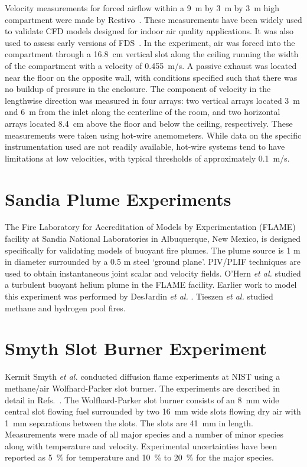 Velocity measurements for forced airflow within a 9~m by 3~m by 3~m high compartment were made by Restivo~\cite{Restivo:1979}. These measurements
have been widely used to validate CFD models designed for indoor air quality applications. It was also used to assess early versions of
FDS~\cite{Emmerich:1,Emmerich:2,Musser:1}. In the experiment, air was forced into the compartment through a 16.8~cm vertical slot along the ceiling
running the width of the compartment with a velocity of 0.455~m/s. A passive exhaust was located near the floor on the opposite wall, with
conditions specified such that there was no buildup of pressure in the enclosure. The component
of velocity in the lengthwise direction was measured in four arrays: two vertical arrays located 3~m and 6~m  from the inlet along the
centerline of the room, and two horizontal arrays located 8.4~cm above the floor and below the ceiling, respectively.
These measurements were taken using hot-wire anemometers. While data on the specific
instrumentation used are not readily available, hot-wire systems tend to have limitations at low velocities,
with typical thresholds of approximately 0.1~m/s.


\section{Sandia Plume Experiments}

The Fire Laboratory for Accreditation of Models by Experimentation (FLAME) facility \cite{OHern:2005,Blanchat:2001} at Sandia National Laboratories in Albuquerque, New Mexico,
is designed specifically for validating models of buoyant fire plumes.  The plume source is 1 m in diameter surrounded by a 0.5 m steel `ground plane'.
PIV/PLIF techniques are used to obtain instantaneous joint scalar and velocity fields.  O'Hern {\em et al.} \cite{OHern:2005} studied a turbulent buoyant helium plume in the FLAME facility.
Earlier work to model this experiment was performed by DesJardin {\em et al.} \cite{DesJardin:2004}. Tieszen {\em et al.} \cite{Tieszen:2004,Tieszen:2002} studied methane and
hydrogen pool fires.


\section{Smyth Slot Burner Experiment}

Kermit Smyth {\em et al.} conducted diffusion flame experiments at NIST using a methane/air Wolfhard-Parker slot burner.  The experiments are described in
detail in Refs.~\cite{Norton:1,Smyth:1}.  The Wolfhard-Parker slot burner consists of an 8~mm wide
central slot flowing fuel surrounded by two 16~mm wide slots flowing dry air with 1~mm separations between the slots.
The slots are 41~mm in length.  Measurements were made of all major species and a number of minor species along with temperature
and velocity.  Experimental uncertainties have been reported as 5~\% for temperature  and 10~\% to 20~\%
for the major species.


